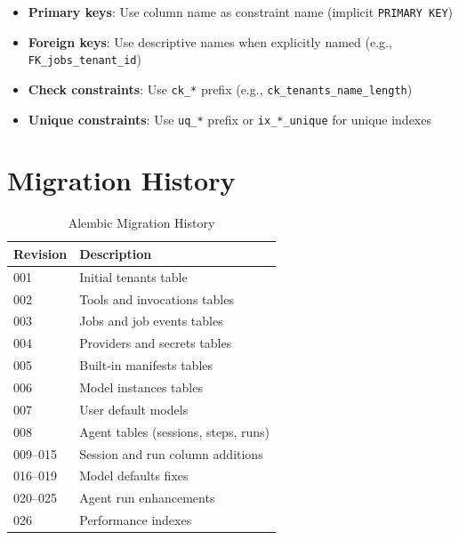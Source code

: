 \begin{itemize}
    \item \textbf{Primary keys}: Use column name as constraint name (implicit \texttt{PRIMARY KEY})
    \item \textbf{Foreign keys}: Use descriptive names when explicitly named (e.g., \texttt{FK\_jobs\_tenant\_id})
    \item \textbf{Check constraints}: Use \texttt{ck\_*} prefix (e.g., \texttt{ck\_tenants\_name\_length})
    \item \textbf{Unique constraints}: Use \texttt{uq\_*} prefix or \texttt{ix\_*\_unique} for unique indexes
\end{itemize}

\section{Migration History}
\label{app:db:migrations}

\begin{table}[ht]
\centering
\caption{Alembic Migration History}
\label{tab:migrations}
\small
\begin{tabularx}{\textwidth}{lX}
    \hline
    \textbf{Revision} & \textbf{Description} \\
    \hline
    001 & Initial tenants table \\
    002 & Tools and invocations tables \\
    003 & Jobs and job events tables \\
    004 & Providers and secrets tables \\
    005 & Built-in manifests tables \\
    006 & Model instances tables \\
    007 & User default models \\
    008 & Agent tables (sessions, steps, runs) \\
    009--015 & Session and run column additions \\
    016--019 & Model defaults fixes \\
    020--025 & Agent run enhancements \\
    026 & Performance indexes \\
    \hline
\end{tabularx}
\end{table}

